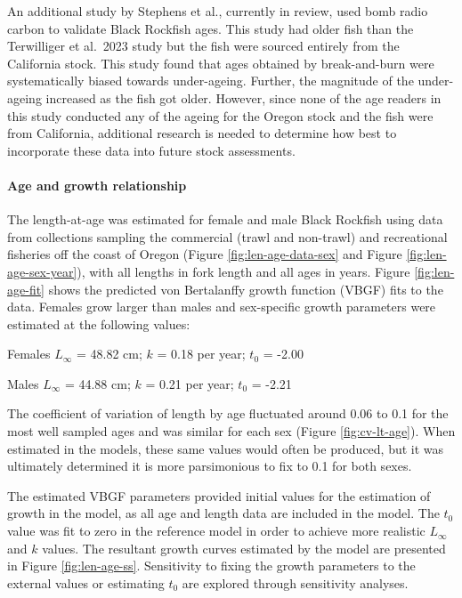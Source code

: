 \documentclass[11pt,
  letterpaper,
]{article}
\begin{document}
An additional study by Stephens et al., currently in review, used bomb radio carbon to validate Black Rockfish ages. This study had older fish than the Terwilliger et al.~2023 study but the fish were sourced entirely from the California stock. This study found that ages obtained by break-and-burn were systematically biased towards under-ageing. Further, the magnitude of the under-ageing increased as the fish got older. However, since none of the age readers in this study conducted any of the ageing for the Oregon stock and the fish were from California, additional research is needed to determine how best to incorporate these data into future stock assessments.

\hypertarget{age-and-growth-relationship}{%
\paragraph{Age and growth relationship}\label{age-and-growth-relationship}}

The length-at-age was estimated for female and male Black Rockfish using data from collections sampling the commercial (trawl and non-trawl) and recreational fisheries off the coast of Oregon (Figure \ref{fig:len-age-data-sex} and Figure \ref{fig:len-age-sex-year}), with all lengths in fork length and all ages in years. Figure \ref{fig:len-age-fit} shows the predicted von Bertalanffy growth function (VBGF) fits to the data. Females grow larger than males and sex-specific growth parameters were estimated at the following values:

\begin{centering}

Females $L_{\infty}$ = 48.82 cm; $k$ = 0.18 per year; $t_0$ = -2.00

Males $L_{\infty}$ = 44.88 cm; $k$ = 0.21 per year; $t_0$ = -2.21

\end{centering}

\vspace{0.5cm}

The coefficient of variation of length by age fluctuated around 0.06 to 0.1 for the most well sampled ages and was similar for each sex (Figure \ref{fig:cv-lt-age}). When estimated in the models, these same values would often be produced, but it was ultimately determined it is more parsimonious to fix to 0.1 for both sexes.

The estimated VBGF parameters provided initial values for the estimation of growth in the model, as all age and length data are included in the model. The \(t_0\) value was fit to zero in the reference model in order to achieve more realistic \(L_{\infty}\) and \(k\) values. The resultant growth curves estimated by the model are presented in Figure \ref{fig:len-age-ss}. Sensitivity to fixing the growth parameters to the external values or estimating \(t_0\) are explored through sensitivity analyses.
\end{document}
